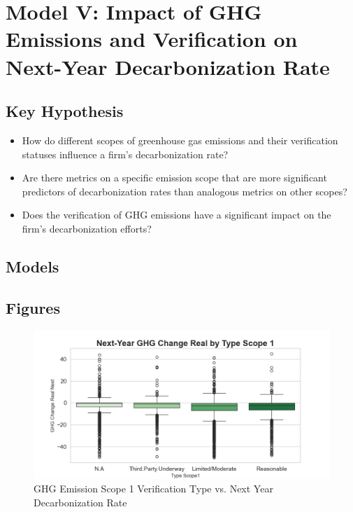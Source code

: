 \section{Model V: Impact of GHG Emissions and Verification on Next-Year Decarbonization Rate}

\subsection{Key Hypothesis}
\begin{itemize}
    \item How do different scopes of greenhouse gas emissions and their verification statuses influence a firm's decarbonization rate?
    \item Are there metrics on a specific emission scope that are more significant predictors of decarbonization rates than analogous metrics on other scopes?
    \item Does the verification of GHG emissions have a significant impact on the firm's decarbonization efforts?
\end{itemize}

\subsection{Models}



\subsection{Figures}
\begin{figure}[H]
\centering
  \includegraphics[width=\textwidth]{figures/ghg_change_real_next_by_type_scope1.png}
\caption{GHG Emission Scope 1 Verification Type vs. Next Year Decarbonization Rate}
\label{fig:ghg_change_real_next_by_ghg_type}
\end{figure}

